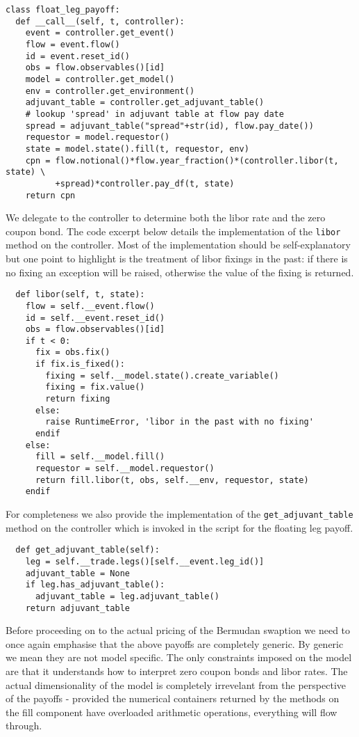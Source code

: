\begin{verbatim}
class float_leg_payoff:
  def __call__(self, t, controller):
    event = controller.get_event() 
    flow = event.flow()
    id = event.reset_id()
    obs = flow.observables()[id]
    model = controller.get_model()
    env = controller.get_environment()
    adjuvant_table = controller.get_adjuvant_table()
    # lookup 'spread' in adjuvant table at flow pay date
    spread = adjuvant_table("spread"+str(id), flow.pay_date())
    requestor = model.requestor()
    state = model.state().fill(t, requestor, env)
    cpn = flow.notional()*flow.year_fraction()*(controller.libor(t, state) \
          +spread)*controller.pay_df(t, state)
    return cpn
\end{verbatim}

We delegate to the controller to determine both the libor rate and the zero coupon bond. The code excerpt below details the implementation 
of the \verb|libor| method on the controller. Most of the implementation should be self-explanatory but one point to highlight is the treatment 
of libor fixings in the past: if there is no fixing an exception will be raised, otherwise the value of the fixing is returned.

\begin{verbatim}
  def libor(self, t, state):
    flow = self.__event.flow()
    id = self.__event.reset_id()
    obs = flow.observables()[id]
    if t < 0:
      fix = obs.fix()
      if fix.is_fixed():
        fixing = self.__model.state().create_variable()
        fixing = fix.value()
        return fixing
      else:
        raise RuntimeError, 'libor in the past with no fixing'
      endif      
    else:
      fill = self.__model.fill()
      requestor = self.__model.requestor()
      return fill.libor(t, obs, self.__env, requestor, state)
    endif
\end{verbatim}
For completeness we also provide the implementation of the \verb|get_adjuvant_table| method on the controller which is invoked in 
the script for the floating leg payoff.
\begin{verbatim}
  def get_adjuvant_table(self):
    leg = self.__trade.legs()[self.__event.leg_id()]
    adjuvant_table = None
    if leg.has_adjuvant_table():
      adjuvant_table = leg.adjuvant_table()
    return adjuvant_table
\end{verbatim}

Before proceeding on to the actual pricing of the Bermudan swaption we need to once again emphasise that the above payoffs are completely 
generic. By generic we mean they are not model specific. The only constraints imposed on the model are that it understands how to interpret zero coupon 
bonds and libor rates. The actual dimensionality of the model is completely irrevelant from the perspective of the payoffs - provided the numerical 
containers returned by the methods on the fill component have overloaded arithmetic operations, everything will flow through.

